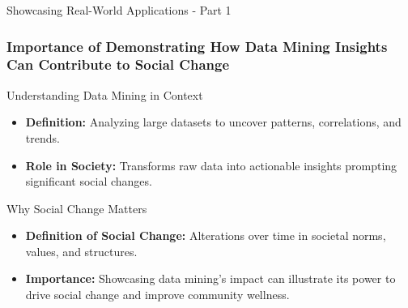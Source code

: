 \documentclass[aspectratio=169]{beamer}
\begin{document}
\begin{frame}[fragile]{Showcasing Real-World Applications - Part 1}
    \frametitle{Importance of Demonstrating How Data Mining Insights Can Contribute to Social Change}
    
    \begin{block}{Understanding Data Mining in Context}
        \begin{itemize}
            \item \textbf{Definition:} Analyzing large datasets to uncover patterns, correlations, and trends.
            \item \textbf{Role in Society:} Transforms raw data into actionable insights prompting significant social changes.
        \end{itemize}
    \end{block}

    \begin{block}{Why Social Change Matters}
        \begin{itemize}
            \item \textbf{Definition of Social Change:} Alterations over time in societal norms, values, and structures.
            \item \textbf{Importance:} Showcasing data mining’s impact can illustrate its power to drive social change and improve community wellness.
        \end{itemize}
    \end{block}
\end{frame}
\end{document}
